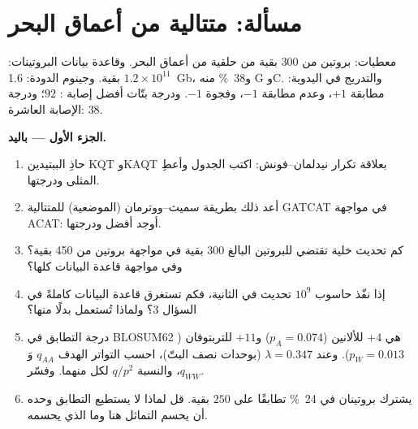 \section{مسألة: متتالية من أعماق البحر}

\begin{problem}
\label{pb:b3:bioinformatics:1}
معطيات: بروتين من \num{300} بقية من حلقية من أعماق البحر. وقاعدة
بيانات البروتينات: $1.2\times 10^{11}$ بقية. وجينوم الدودة:
\qty{1.6}{Gb}، و\qty{38}{\%} منه G وC. والتدريج في  اليدوية: مطابقة $+1$،
وعدم مطابقة $-1$، وفجوة $-1$. ودرجة بتّات أفضل إصابة : $92$؛ ودرجة
الإصابة العاشرة: $38$.

\medskip
\noindent\textbf{الجزء الأول --- باليد.}
\begin{enumerate}
  \item حاذِ الببتيدين KQT وKAQT بعلاقة تكرار
        نيدلمان--فونش: اكتب الجدول وأعطِ  المثلى
        ودرجتها.
  \item أعد ذلك بطريقة سميث--ووترمان (الموضعية) للمتتالية GATCAT في مواجهة ACAT:
        أوجد أفضل  ودرجتها.
  \item كم تحديث خلية تقتضي  للبروتين البالغ
        \num{300} بقية في مواجهة بروتين من \num{450} بقية؟
        وفي مواجهة قاعدة البيانات كلها؟
  \item إذا نفّذ حاسوب $10^{9}$ تحديث في الثانية، فكم
        تستغرق  قاعدة البيانات كاملةً في السؤال 3؟ ولماذا
        تُستعمل  بدلًا منها؟
  \item درجة التطابق في BLOSUM62 هي $+4$ للألانين ($p_{A} =
        0.074$) و$+11$ للتربتوفان ($p_{W} = 0.013$). وعند
        $\lambda = 0.347$ (بوحدات نصف البتّ)، احسب التواتر
        الهدف $q_{AA}$ وَ$q_{WW}$، والنسبة $q/p^{2}$ لكل
        منهما. وفسّر.
  \item يشترك بروتينان في \qty{24}{\%} تطابقًا على $250$ بقية.
        قل لماذا لا يستطيع التطابق وحده أن يحسم التماثل هنا وما
        الذي يحسمه.
\end{enumerate}


\end{problem}
